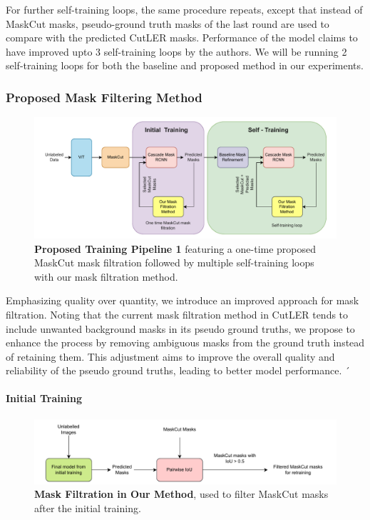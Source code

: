 For further self-training loops, the same procedure repeats, except that instead of MaskCut masks, pseudo-ground truth masks of the last round are used to compare with the predicted CutLER masks. Performance of the model claims to have improved upto 3 self-training loops by the authors. We will be running 2 self-training loops for both the baseline and proposed method in our experiments.


\subsubsection{Proposed Mask Filtering Method}
\label{section:proposed_method}

\begin{figure}
	\centering
	\includegraphics[width=1\textwidth]{Images/main/proposed_method_last.pdf}
	\caption[\textbf{Proposed Training Pipeline 1}]{\textbf{Proposed Training Pipeline 1} featuring a one-time proposed MaskCut mask filtration followed by multiple self-training loops with our mask filtration method.}
	\label{fig:proposed_training}
\end{figure}
Emphasizing quality over quantity, we introduce an improved approach for mask filtration. Noting that the current mask filtration method in CutLER tends to include unwanted background masks in its pseudo ground truths, we propose to enhance the process by removing ambiguous masks from the ground truth instead of retaining them. This adjustment aims to improve the overall quality and reliability of the pseudo ground truths, leading to better model performance.
´
\paragraph{Initial Training}
\begin{figure}
	\centering
	\includegraphics[width=1\textwidth]{Images/main/our_mask_filtration_1.pdf}
	\caption[\textbf{Mask Filtration in Proposed Method}]{\textbf{Mask Filtration in Our Method}, used to filter MaskCut masks after the initial training.}
	\label{fig:our_mask_filtration}
\end{figure}

